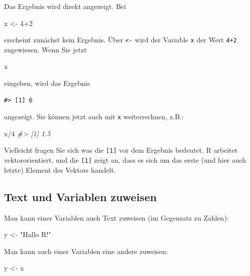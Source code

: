 \documentclass[12pt,ngerman,]{book}
\makeatletter
\newenvironment{Shaded}{\begin{snugshade}}{\end{snugshade}}
\newcommand{\DecValTok}[1]{\textcolor[rgb]{0.00,0.00,0.81}{{#1}}}
\newcommand{\StringTok}[1]{\textcolor[rgb]{0.31,0.60,0.02}{{#1}}}
\newcommand{\CommentTok}[1]{\textcolor[rgb]{0.56,0.35,0.01}{\textit{{#1}}}}
\newcommand{\NormalTok}[1]{{#1}}
\newenvironment{kframe}{%
\medskip{}
\setlength{\fboxsep}{.8em}
 \def\at@end@of@kframe{}%
 \ifinner\ifhmode%
  \def\at@end@of@kframe{\end{minipage}}%
  \begin{minipage}{\columnwidth}%
 \fi\fi%
 \def\FrameCommand##1{\hskip\@totalleftmargin \hskip-\fboxsep
 \colorbox{shadecolor}{##1}\hskip-\fboxsep
     \hskip-\linewidth \hskip-\@totalleftmargin \hskip\columnwidth}%
 \MakeFramed {\advance\hsize-\width
   \@totalleftmargin\z@ \linewidth\hsize
   \@setminipage}}%
 {\par\unskip\endMakeFramed%
 \at@end@of@kframe}
\renewenvironment{Shaded}{\begin{kframe}}{\end{kframe}}
\makeatother
\begin{document}
Das Ergebnis wird direkt angezeigt. Bei

\begin{Shaded}
\begin{Highlighting}[]
\NormalTok{x <-}\StringTok{ }\DecValTok{4+2} 
\end{Highlighting}
\end{Shaded}

erscheint zunächst kein Ergebnis. Über \texttt{\textless{}-} wird der
Variable \texttt{x} der Wert \texttt{4+2} zugewiesen. Wenn Sie jetzt

\begin{Shaded}
\begin{Highlighting}[]
\NormalTok{x }
\end{Highlighting}
\end{Shaded}

eingeben, wird das Ergebnis

\begin{verbatim}
#> [1] 6
\end{verbatim}

angezeigt. Sie können jetzt auch mit \texttt{x} weiterrechnen, z.B.:

\begin{Shaded}
\begin{Highlighting}[]
\NormalTok{x/}\DecValTok{4} 
\CommentTok{#> [1] 1.5}
\end{Highlighting}
\end{Shaded}

Vielleicht fragen Sie sich was die \texttt{{[}1{]}} vor dem Ergebnis
bedeutet. R arbeitet vektororientiert, und die \texttt{{[}1{]}} zeigt
an, dass es sich um das erste (und hier auch letzte) Element des Vektors
handelt.

\subsection{Text und Variablen
zuweisen}\label{text-und-variablen-zuweisen}

Man kann einer Variablen auch Text zuweisen (im Gegensatz zu Zahlen):

\begin{Shaded}
\begin{Highlighting}[]
\NormalTok{y <-}\StringTok{ "Hallo R!"}
\end{Highlighting}
\end{Shaded}

Man kann auch einer Variablen eine andere zuweisen:

\begin{Shaded}
\begin{Highlighting}[]
\NormalTok{y <-}\StringTok{ }\NormalTok{x}
\end{Highlighting}
\end{Shaded}
\end{document}
